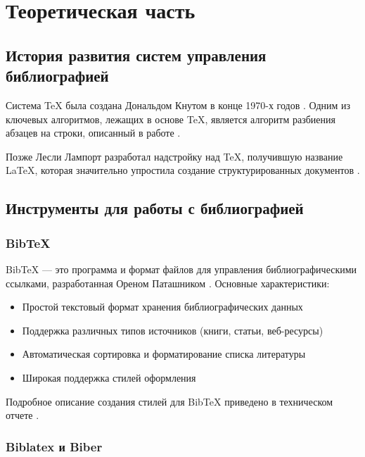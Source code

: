 \documentclass[12pt, a4paper]{article}
\begin{document}
\section{Теоретическая часть}

\subsection{История развития систем управления библиографией}

Система TeX была создана Дональдом Кнутом в конце 1970-х годов \parencite{knuth1984}. Одним из ключевых алгоритмов, лежащих в основе TeX, является алгоритм разбиения абзацев на строки, описанный в работе \textcite{knuth1977}.

Позже Лесли Лампорт разработал надстройку над TeX, получившую название LaTeX, которая значительно упростила создание структурированных документов \parencite{lamport1994}.

\subsection{Инструменты для работы с библиографией}

\subsubsection{BibTeX}

BibTeX — это программа и формат файлов для управления библиографическими ссылками, разработанная Ореном Паташником \parencite{patashnik1988}. Основные характеристики:

\begin{itemize}
  \item Простой текстовый формат хранения библиографических данных
  \item Поддержка различных типов источников (книги, статьи, веб-ресурсы)
  \item Автоматическая сортировка и форматирование списка литературы
  \item Широкая поддержка стилей оформления
\end{itemize}

Подробное описание создания стилей для BibTeX приведено в техническом отчете \textcite{bibtex-guide}.

\subsubsection{Biblatex и Biber}
\end{document}
